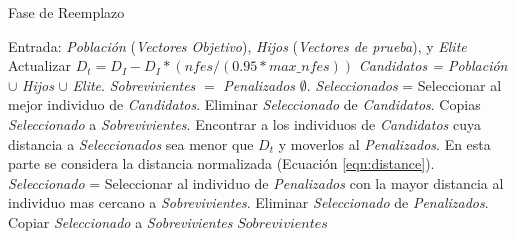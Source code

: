 \begin{algorithm}[t]
  \scriptsize
	\caption{Fase de Reemplazo} \label{alg:Replacement}
	\begin{algorithmic}[1]
	\STATE Entrada: \textit{Población} (\textit{Vectores Objetivo}), \textit{Hijos} (\textit{Vectores de prueba}), y \textit{Elite}
	\STATE Actualizar $D_t = D_I - D_I *(nfes/(0.95*max\_nfes)) $ 
	\STATE \textit{Candidatos = Población} $\cup$ \textit{Hijos} $\cup$ \textit{Elite}.
	\STATE \textit{Sobrevivientes} $=$ \textit{Penalizados} $\emptyset$.
	   \STATE \textit{Seleccionados} = Seleccionar al mejor individuo de \textit{Candidatos}.
		 \STATE Eliminar \textit{Seleccionado} de \textit{Candidatos}.
	   \STATE Copias \textit{Seleccionado} a \textit{Sobrevivientes}.
	   \STATE Encontrar a los individuos de \textit{Candidatos} cuya distancia a \textit{Seleccionados} sea menor que $D_t$ y moverlos al \textit{Penalizados}. En esta parte se considera la distancia normalizada (Ecuación \ref{eqn:distance}).
	\ENDWHILE
	   \STATE \textit{Seleccionado} = Seleccionar al individuo de \textit{Penalizados} con la mayor distancia al individuo mas cercano a \textit{Sobrevivientes}.
		 \STATE Eliminar \textit{Seleccionado} de \textit{Penalizados}.
	   \STATE Copiar \textit{Seleccionado} a \textit{Sobrevivientes}
	\ENDWHILE
  \RETURN $Sobrevivientes$
\end{algorithmic}
\end{algorithm}

